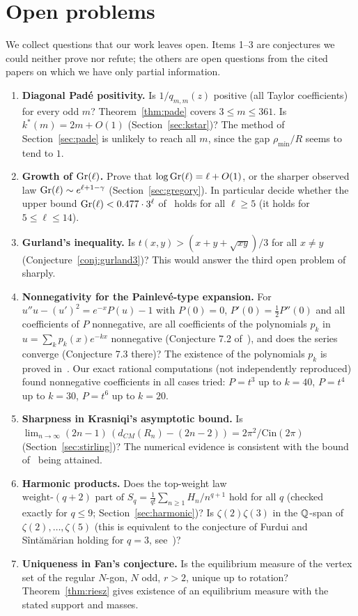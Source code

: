 \section{Open problems}\label{sec:open}

We collect questions that our work leaves open. Items 1--3 are conjectures we could neither prove nor refute; the others are open questions from the cited papers on which we have only partial information.

\begin{enumerate}[leftmargin=2em]
\item \textbf{Diagonal Pad\'e positivity.} Is $1/q_{m,m}(z)$ positive (all Taylor coefficients) for every odd $m$? Theorem~\ref{thm:pade} covers $3\le m\le361$. Is $k^*(m)=2m+O(1)$ (Section~\ref{sec:kstar})? The method of Section~\ref{sec:pade} is unlikely to reach all $m$, since the gap $\rho_{\min}/R$ seems to tend to $1$.
\item \textbf{Growth of $\mathrm{Gr}(\ell)$.} Prove that $\log\mathrm{Gr}(\ell)=\ell+O(1)$, or the sharper observed law $\mathrm{Gr}(\ell)\sim e^{\ell+1-\gamma}$ (Section~\ref{sec:gregory}). In particular decide whether the upper bound $\mathrm{Gr}(\ell)<0.477\cdot3^\ell$ of~\cite{XZ} holds for all $\ell\ge5$ (it holds for $5\le\ell\le14$).
\item \textbf{Gurland's inequality.} Is $t(x,y)>(x+y+\sqrt{xy})/3$ for all $x\ne y$ (Conjecture~\ref{conj:gurland3})? This would answer the third open problem of~\cite{Wis} sharply.
\item \textbf{Nonnegativity for the Painlev\'e-type expansion.} For $u''u-(u')^2=e^{-x}P(u)-1$ with $P(0)=0$, $P'(0)=\tfrac12P''(0)$ and all coefficients of $P$ nonnegative, are all coefficients of the polynomials $p_k$ in $u=\sum_kp_k(x)e^{-kx}$ nonnegative (Conjecture 7.2 of~\cite{HH}), and does the series converge (Conjecture 7.3 there)? The existence of the polynomials $p_k$ is proved in~\cite{HH2}. Our exact rational computations (not independently reproduced) found nonnegative coefficients in all cases tried: $P=t^3$ up to $k=40$, $P=t^4$ up to $k=30$, $P=t^6$ up to $k=20$.
\item \textbf{Sharpness in Krasniqi's asymptotic bound.} Is $\lim_{n\to\infty}(2n-1)\,(d_{CM}(R_n)-(2n-2))=2\pi^2/\mathrm{Cin}(2\pi)$ (Section~\ref{sec:stirling})? The numerical evidence is consistent with the bound of~\cite{Kr} being attained.
\item \textbf{Harmonic products.} Does the top-weight law $\text{weight-}(q+2)\text{ part of }S_q=\frac1{q!}\sum_{n\ge1}H_n/n^{q+1}$ hold for all $q$ (checked exactly for $q\le9$; Section~\ref{sec:harmonic})? Is $\zeta(2)\zeta(3)$ in the $\mathbb{Q}$-span of $\zeta(2),\dots,\zeta(5)$ (this is equivalent to the conjecture of Furdui and Sîntămărian holding for $q=3$, see~\cite{CN})?
\item \textbf{Uniqueness in Fan's conjecture.} Is the equilibrium measure of the vertex set of the regular $N$-gon, $N$ odd, $r>2$, unique up to rotation? Theorem~\ref{thm:riesz} gives existence of an equilibrium measure with the stated support and masses.
\end{enumerate}
